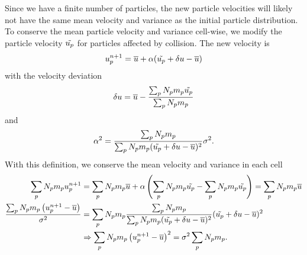 Since we have a finite number of particles, the new particle velocities will likely not have the same mean velocity and variance as the initial particle distribution. 
To conserve the mean particle velocity and variance cell-wise, we modify the particle velocity $\tilde{u_p}$ for particles affected by collision. The new velocity is 
\begin{equation}
\label{eq:rtiUpdate}
    u_p^{n+1} = \overline{u} + \alpha (\tilde{u_p} + \delta u - \overline{u})
\end{equation}
with the velocity deviation
\begin{equation}
    \delta u = \overline{u} - \dfrac{\sum_pN_p m_p \tilde{u_p}}{\sum_p N_p m_p}
\end{equation}
and
\begin{equation}
    \alpha^2 = \dfrac{\sum_p N_p m_p}{\sum_p N_p m_p (\tilde{u_p}+ \delta u - \overline{u})^2} \sigma^2.
\end{equation}
With this definition, we conserve the mean velocity and variance in each cell
\begin{align}
\sum_p N_p m_p u_p^{n+1} &= \sum_p N_p m_p\overline{u} + \alpha \left( \sum_p N_p m_p \tilde{u_p} - \sum_p N_p m_p \tilde{u_p}\right) = \sum_p N_p m_p \overline{u} \\
\dfrac{\sum_p N_p m_p \left( u_p^{n+1} - \overline{u} \right)}{\sigma^2} &= \sum_p N_p m_p \dfrac{\sum_p N_p m_p}{\sum_p N_p m_p ( \tilde{u_p} + \delta u - \overline{u})^2} (\tilde{u_p} + \delta u - \overline{u})^2 \\
&\Rightarrow \sum_p N_p m_p \left( u_p^{n+1} - \overline{u} \right)^2 = \sigma^2 \sum_p N_p m_p.
\end{align}

